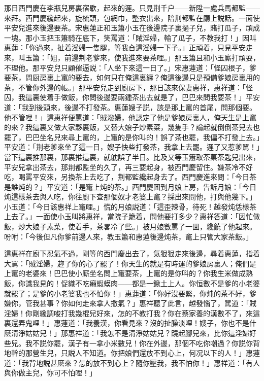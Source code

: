 那日西門慶在李瓶兒房裏宿歇，起來的遲。只見荆千户——新陞一處兵馬都監——來拜。西門慶纔起來，旋梳頭，包網巾，整衣出來，陪荆都監在廳上説話。一面使平安兒進來後邊要茶。宋惠蓮正和玉簫小玉在後邊院子裏撾子兒，賭打瓜子，頑成一塊。那小玉把玉簫騎在底下，笑罵道：「賊淫婦，輸了瓜子，不教我打！」因叫惠蓮：「你過來，扯着淫婦一隻腿，等我㒲這淫婦一下子。」正頑着，只見平安走來，叫玉簫：「姐，前邊荆老爹來，使我進來要茶哩。」那玉簫且和小玉廝打頑耍，不理他。那平安兒只顧催逼説：「人坐下來這一日了。」宋惠蓮道：「怪囚根子，爹要茶，問厨房裏上竃的要去，如何只在俺這裏纏？俺這後邊只是預備爹娘房裏用的茶，不管你外邊的帳。」那平安兒走到廚房下，那日該來保妻惠祥，惠祥道：「怪囚，我這裏使着手做飯，你問後邊要兩鍾茶出去就是了，巴巴來問我要茶！」平安道：「我到後頭來，後邊不打發茶。惠蓮嫂子説，該是那上竃的首尾，問那個要。他不管哩！」這惠祥便罵道：「賊潑婦，他認定了他是爹娘房裏人，俺天生是上竃的來？我這裏又做大家夥裏飯，又替大娘子炒素菜，幾隻手？論起就倒倒茶兒去也罷了，巴巴坐名兒來尋上竃的，上竃的是你叫的！誤了茶也罷，我偏不打發上去。」平安道：「荆老爹來坐了這一日，嫂子快些打發茶，我拿上去罷。遲了又惹爹駡！」當下這裏推那裏，那裏推這裏，就躭誤了半日。比及又等玉簫取茶菓茶匙兒出來，平安兒拿出茶去，那荆都監坐的久了，再三要起身，被西門慶留住。嫌茶冷不好吃，喝罵平安來，另換茶上去吃了，荆都監纔起身去了。西門慶進來問：「今日茶是誰炖的？」平安道：「是竃上炖的茶。」西門慶囬到月娘上房，告訴月娘：「今日炖這樣茶去與人吃，你往廚下查那個奴才老婆上竃？採出來問他，打與他幾下。」小玉道：「今日該惠祥上竃哩。」慌的月娘説道：「這歪辣骨，待死！越發炖恁樣茶上去了。」一面使小玉叫將惠祥，當院子跪着，問他要打多少？惠祥答道：「因忙做飯，炒大娘子素菜，使着手，茶畧冷了些。」被月娘數罵了一囬，纔饒了他起來。吩咐：「今後但凡你爹前邊人來，教玉簫和惠蓮後邊炖茶，竃上只管大家茶飯。」

這惠祥在廚下忍氣不過，剛等的西門慶出去了，氣狠狠走來後邊，尋着惠蓮，指着大駡：「賊淫婦，趂了你的心了罷了！你天生的就是有時運的爹娘房裏人；俺們是上竃的老婆來！巴巴使小廝坐名問上竃要茶，上竃的是你呌的？你我生米做成熟飯，你識我見的！促織不吃癩蝦蟆肉——都是一鍬土上人。你恒數不是爹的小老婆就罷了；是爹的小老婆我也不怕你！」惠蓮道：「你好沒要緊，你炖的茶不好，爹嫌你，管我甚事？你如何走來拿人撒氣？」惠祥聽了此言，越發惱了，駡道：「賊淫婦！你剛纔調唆打我幾棍兒好來，怎的不教打我？你在蔡家養的漢數不了，來這裏還弄鬼哩！」惠蓮道：「我養漢，你看見來？沒的扯臊淡哩！嫂子，你也不是什麽清淨姑姑兒！」那惠祥道：「我怎不是清淨姑姑兒？蹺起腳兒來，比你這淫婦好些兒。我不説你罷，漢子有一拿小米數兒！你在外邊，那個不吃你嘲過？你説你背地幹的那營生兒，只説人不知道。你把娘們還放不到心上，何况以下的人！」惠蓮道：「我背地説甚麽來？怎的放不到心上？隨你壓我，我不怕你！」惠祥道：「有人與你做主兒，你可不怕哩！」

